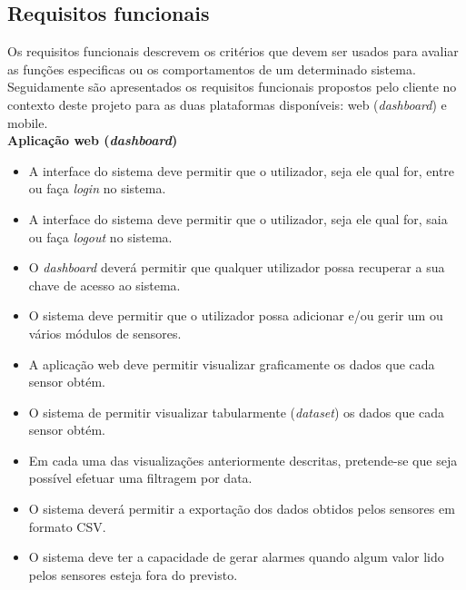\subsection{Requisitos funcionais}


Os requisitos funcionais descrevem os critérios que devem ser usados para avaliar as funções especificas ou os comportamentos de um determinado sistema. Seguidamente são apresentados os requisitos funcionais propostos pelo cliente no contexto deste projeto para as duas plataformas disponíveis: web (\textit{dashboard}) e mobile. \\


\textbf{Aplicação web (\textit{dashboard})}


\begin{itemize}
	\item A interface do sistema deve permitir que o utilizador, seja ele qual for, entre ou faça \textit{login} no sistema. 
	
	\item A interface do sistema deve permitir que o utilizador, seja ele qual for, saia ou faça \textit{logout} no sistema.
	
	\item O \textit{dashboard} deverá permitir que qualquer utilizador possa recuperar a sua chave de acesso ao sistema.

	\item O sistema deve permitir que o utilizador possa adicionar e/ou gerir um ou vários módulos de sensores. 
	
	\item A aplicação web deve permitir visualizar graficamente os dados que cada sensor obtém. 
		
	\item O sistema de permitir visualizar tabularmente (\textit{dataset}) os dados que cada sensor obtém. 
	
	\item Em cada uma das visualizações anteriormente descritas, pretende-se que seja possível efetuar uma filtragem por data.
	
	\item O sistema deverá permitir a exportação dos dados obtidos pelos sensores  em formato \ac{CSV}. 
		
	\item O sistema deve ter a capacidade de gerar alarmes quando algum valor lido pelos sensores esteja fora do previsto. 
	
\end{itemize}


